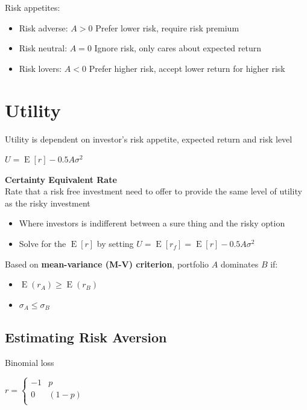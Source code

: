 \documentclass[]{book}
\providecommand{\tightlist}{%
  \setlength{\itemsep}{0pt}\setlength{\parskip}{0pt}}
\theoremstyle{definition}
\theoremstyle{definition}
\theoremstyle{remark}
\begin{document}
Risk appetites:

\begin{itemize}
\tightlist
\item
  Risk adverse: \(A>0\) Prefer lower risk, require risk premium
\item
  Risk neutral: \(A=0\) Ignore risk, only cares about expected return
\item
  Risk lovers: \(A<0\) Prefer higher risk, accept lower return for
  higher risk
\end{itemize}

\section{Utility}\label{utility}

Utility is dependent on investor's risk appetite, expected return and
risk level

\(U = \operatorname{E}[r] - 0.5A\sigma^2\)

 \textbf{Certainty Equivalent Rate}\\
Rate that a risk free investment need to offer to provide the same level
of utility as the risky investment

\begin{itemize}
\item
  Where investors is indifferent between a sure thing and the risky
  option
\item
  Solve for the \(\operatorname{E}[r]\) by setting
  \(U = \operatorname{E}[r_f] = \operatorname{E}[r] - 0.5A\sigma^2\)
\end{itemize}

Based on \textbf{mean-variance (M-V) criterion}, portfolio \(A\)
dominates \(B\) if:

\begin{itemize}
\item
  \(\operatorname{E}(r_A) \geq \operatorname{E}(r_B)\)
\item
  \(\sigma_A \leq \sigma_B\)
\end{itemize}

\subsection{Estimating Risk Aversion}\label{estimating-risk-aversion}

Binomial loss

\(r = \begin{cases} -1 & p \\ 0 & (1-p) \\ \end{cases}\)
\end{document}
